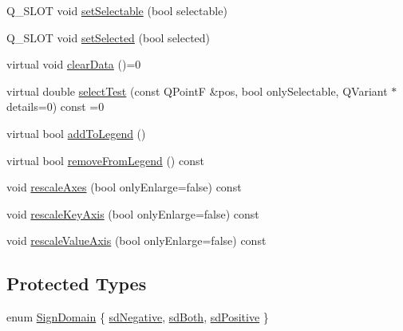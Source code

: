 \begin{DoxyCompactItemize}
\item 
Q\+\_\+\+S\+L\+OT void \mbox{\hyperlink{class_q_c_p_abstract_plottable_a22c69299eb5569e0f6bf084877a37dc4}{set\+Selectable}} (bool selectable)
\item 
Q\+\_\+\+S\+L\+OT void \mbox{\hyperlink{class_q_c_p_abstract_plottable_afbd5428c2952f59d952e11ab5cd79176}{set\+Selected}} (bool selected)
\item 
virtual void \mbox{\hyperlink{class_q_c_p_abstract_plottable_a86e5b8fd4b6ff4f4084e7ea4c573fc53}{clear\+Data}} ()=0
\item 
virtual double \mbox{\hyperlink{class_q_c_p_abstract_plottable_a38efe9641d972992a3d44204bc80ec1d}{select\+Test}} (const Q\+PointF \&pos, bool only\+Selectable, Q\+Variant $\ast$details=0) const =0
\item 
virtual bool \mbox{\hyperlink{class_q_c_p_abstract_plottable_a70f8cabfd808f7d5204b9f18c45c13f5}{add\+To\+Legend}} ()
\item 
virtual bool \mbox{\hyperlink{class_q_c_p_abstract_plottable_ac95fb2604d9106d0852ad9ceb326fe8c}{remove\+From\+Legend}} () const
\item 
void \mbox{\hyperlink{class_q_c_p_abstract_plottable_a1491c4a606bccd2d09e65e11b79eb882}{rescale\+Axes}} (bool only\+Enlarge=false) const
\item 
void \mbox{\hyperlink{class_q_c_p_abstract_plottable_ae96b83c961e257da116c6acf9c7da308}{rescale\+Key\+Axis}} (bool only\+Enlarge=false) const
\item 
void \mbox{\hyperlink{class_q_c_p_abstract_plottable_aa1e408bb2d13999150c3f7f8a8579ca9}{rescale\+Value\+Axis}} (bool only\+Enlarge=false) const
\end{DoxyCompactItemize}
\subsection*{Protected Types}
\begin{DoxyCompactItemize}
\item 
enum \mbox{\hyperlink{class_q_c_p_abstract_plottable_a661743478a1d3c09d28ec2711d7653d8}{Sign\+Domain}} \{ \mbox{\hyperlink{class_q_c_p_abstract_plottable_a661743478a1d3c09d28ec2711d7653d8a0fc9a70796ef60ad18ddd18056e6dc63}{sd\+Negative}}, 
\mbox{\hyperlink{class_q_c_p_abstract_plottable_a661743478a1d3c09d28ec2711d7653d8a082b98cfb91a7363a3b5cd17b0c1cd60}{sd\+Both}}, 
\mbox{\hyperlink{class_q_c_p_abstract_plottable_a661743478a1d3c09d28ec2711d7653d8a02951859f243a4d24e779cfbb5471030}{sd\+Positive}}
 \}
\end{DoxyCompactItemize}
